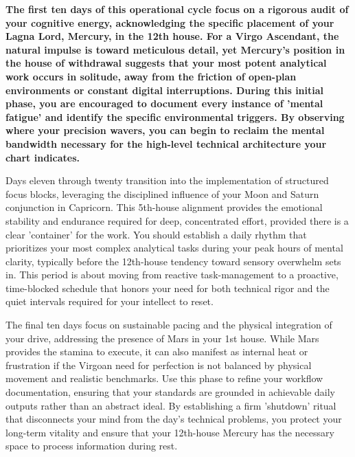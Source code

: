 
\label{topic68}

{\fontsize{9.5}{13.8}\selectfont\bfseries\color{DeepSlate} The first ten days of this operational cycle focus on a rigorous audit of your cognitive energy, acknowledging the specific placement of your Lagna Lord, Mercury, in the 12th house. For a Virgo Ascendant, the natural impulse is toward meticulous detail, yet Mercury's position in the house of withdrawal suggests that your most potent analytical work occurs in solitude, away from the friction of open-plan environments or constant digital interruptions. During this initial phase, you are encouraged to document every instance of 'mental fatigue' and identify the specific environmental triggers. By observing where your precision wavers, you can begin to reclaim the mental bandwidth necessary for the high-level technical architecture your chart indicates.}\par\vspace{2mm}

{\fontsize{9}{13}\selectfont Days eleven through twenty transition into the implementation of structured focus blocks, leveraging the disciplined influence of your Moon and Saturn conjunction in Capricorn. This 5th-house alignment provides the emotional stability and endurance required for deep, concentrated effort, provided there is a clear 'container' for the work. You should establish a daily rhythm that prioritizes your most complex analytical tasks during your peak hours of mental clarity, typically before the 12th-house tendency toward sensory overwhelm sets in. This period is about moving from reactive task-management to a proactive, time-blocked schedule that honors your need for both technical rigor and the quiet intervals required for your intellect to reset.}\par\vspace{1.8mm}

{\fontsize{9}{13}\selectfont The final ten days focus on sustainable pacing and the physical integration of your drive, addressing the presence of Mars in your 1st house. While Mars provides the stamina to execute, it can also manifest as internal heat or frustration if the Virgoan need for perfection is not balanced by physical movement and realistic benchmarks. Use this phase to refine your workflow documentation, ensuring that your standards are grounded in achievable daily outputs rather than an abstract ideal. By establishing a firm 'shutdown' ritual that disconnects your mind from the day's technical problems, you protect your long-term vitality and ensure that your 12th-house Mercury has the necessary space to process information during rest.}\par\vspace{1.8mm}


